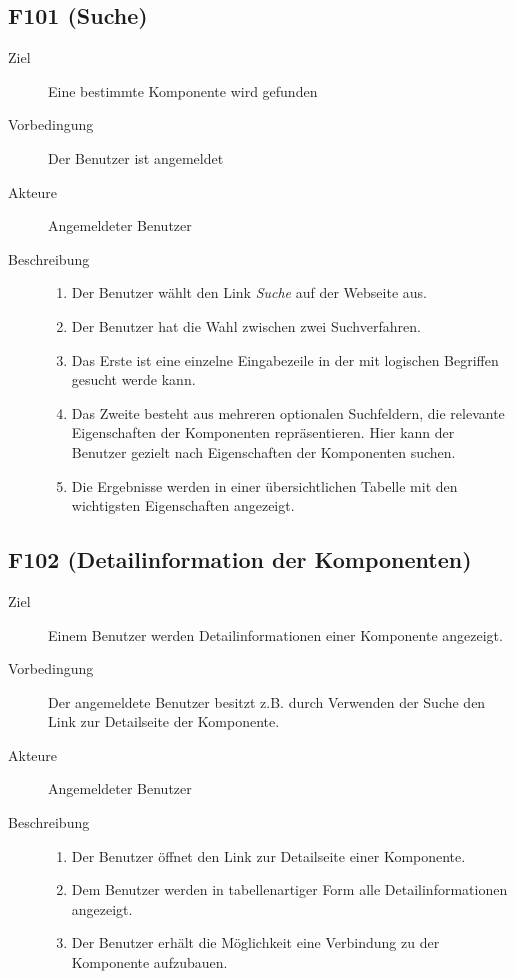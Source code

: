 \subsection{F101 (Suche)}
\label{F:Suche}
\begin{description}
  \item[Ziel]Eine bestimmte Komponente wird gefunden
  \item[Vorbedingung]Der Benutzer ist angemeldet
  \item[Akteure] Angemeldeter Benutzer
   \item[Beschreibung]\hfill
    \begin{enumerate}
      \item Der Benutzer wählt den Link \emph{Suche} auf der Webseite aus.
	  \item Der Benutzer hat die Wahl zwischen zwei Suchverfahren.
	  \item Das Erste ist eine einzelne Eingabezeile in der mit logischen
		Begriffen gesucht werde kann.
	  \item Das Zweite besteht aus mehreren optionalen Suchfeldern, die
		relevante Eigenschaften der Komponenten repräsentieren. Hier kann der
		Benutzer gezielt nach Eigenschaften der Komponenten suchen.
	  \item Die Ergebnisse werden in einer übersichtlichen Tabelle mit den
		wichtigsten Eigenschaften angezeigt.
    \end{enumerate}
\end{description}

\subsection{F102 (Detailinformation der Komponenten)}
\label{F:Details}
\begin{description}
  \item[Ziel]Einem Benutzer werden Detailinformationen einer Komponente
	angezeigt.
  \item[Vorbedingung]Der angemeldete Benutzer besitzt z.B. durch Verwenden der Suche den
	Link zur Detailseite der Komponente.
  \item[Akteure]Angemeldeter Benutzer
   \item[Beschreibung]\hfill
    \begin{enumerate}
      \item Der Benutzer öffnet den Link zur Detailseite einer Komponente.
	  \item Dem Benutzer werden in tabellenartiger Form alle
		Detailinformationen angezeigt.
	  \item Der Benutzer erhält die Möglichkeit eine Verbindung zu der
		Komponente aufzubauen.
    \end{enumerate}
\end{description}

